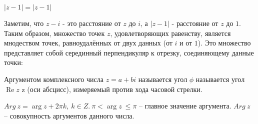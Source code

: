 \documentclass[a4paper,14pt]{article}
\DeclareMathOperator{\realpart}{\mathop{Re}}	%
\DeclareMathOperator{\imgpart}{\mathop{Im}} 	%
\begin{document}
\begin{exmp}
	$|z-1|=|z-1|$
	
	Заметим, что $z-i$ - это расстояние от $z$ до $i$, а $|z-1|$ - расстояние от $z$ до $1$. Таким образом, множество точек $z$, удовлетворяющих равенству, является мнодеством точек, равноудалённых от двух данных (от $i$ и от $1$). Это множество представляет собой серединный перпендикуляр к отрезку, соединяющему данные точки:
	
	\begin{figure}[!htbp]
		\begin{center}
		\end{center}
	\end{figure}	
\end{exmp}
\begin{definition}
	Аргументом комплексного числа $z=a+bi$ называется угол $\phi$ называется угол $\realpart z$ z (оси абсцисс), измеряемый против хода часовой стрелки.
	
	\noindent $Arg\ z=\arg{z+2\pi k,\ k\in Z.\ \pi<\arg{z\ \le\pi}}$ – главное значение аргумента. $Arg\ z$ – совокупность аргументов данного числа.
\end{definition}
\end{document}
